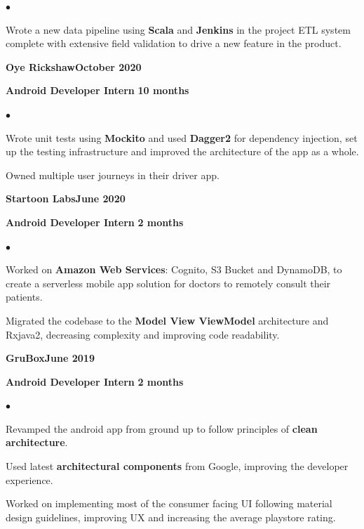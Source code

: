 \documentclass[10pt,a4paper]{extarticle}
\newcommand{\myExperience}[5][ ]{
\textbf{#2}\hfill {\color{darkgray}\textbf{#1}}\\
\begin{small}{
		\color{resumeBlueDark}
		\textbf{#3}
	}
	\hfill%
{\color{gray}\textbf{#4}}\end{small}%
{#5}%
}
\newcommand{\myVolunCertiItem}[4][]{
\begin{flushleft}
	\textbf{#2}\\
	\begin{small}
		{\color{resumeBlueDark}\textbf{#3}}\hfill%
		{\color{gray}\textbf{#4}}
	\end{small}
\end{flushleft}
{#1}
}
\begin{document}
\begin{minipage}{0.4\textwidth}
{\begin{list}{\color{resumeBlueLight}$\bullet$}{\leftmargin 3mm}
			\vspace{-2mm}
			\item{Wrote a new data pipeline using \textbf{Scala} and \textbf{Jenkins} in the project ETL system complete with extensive field validation to drive a new feature in the product.}
		\end{list}
	}%
	\myExperience[October 2020]{Oye Rickshaw}{Android Developer Intern}{10 months}
	{%
	\vspace{-2mm}
		\begin{list}{\color{resumeBlueLight}$\bullet$}{\leftmargin 3mm}%
			\item{Wrote unit tests using \textbf{Mockito} and used \textbf{Dagger2} for dependency injection, set up the testing infrastructure and improved the architecture of the app as a whole.}
			\vspace{-2mm}
			\item{Owned multiple user journeys in their driver app.}
		\end{list}
	}
	\myExperience[June 2020]{Startoon Labs}{Android Developer Intern}{2 months}
	{%
	\vspace{-2mm}
		\begin{list}{\color{resumeBlueLight}$\bullet$}{\leftmargin 3mm}
			\item{Worked on \textbf{Amazon Web Services}: Cognito, S3 Bucket and DynamoDB, to create a serverless mobile app solution for doctors to remotely consult their patients.}
			\vspace{-2mm}
			\item{Migrated the codebase to the \textbf{Model View ViewModel} architecture and Rxjava2, decreasing complexity and improving code readability.}
		\end{list}
	}
	\myExperience[June 2019]{GruBox}{Android Developer Intern}{2 months}
	{%
	\vspace{-2mm}
		\begin{list}{\color{resumeBlueLight}$\bullet$}{\leftmargin 3mm}
			\item{Revamped the android app from ground up to follow principles of \textbf{clean architecture}.}
			\vspace{-2mm}
			\item{Used latest \textbf{architectural components} from Google, improving the developer experience.}
			\vspace{-2mm}
			\item{Worked on implementing most of the consumer facing UI following material design guidelines, improving UX and increasing the average playstore rating.}
		\end{list}
	}
\end{minipage}
\end{document}
